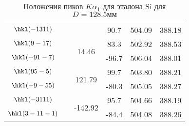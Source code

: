 \begin{table}[ht!]
\begin{tabular}{ |c|c|c|c|c|c| }
        $  \hkl(-1 3 11)$ &                         &                          &                90.7 &              504.09 &              388.18 \\
        $   \hkl(9 -1 7)$ &                         &   \multirow{2}{*}{14.46} &                83.3 &              502.92 &              388.53 \\
        $  \hkl(-9 1 -7)$ &                         &                          &               -96.7 &              506.04 &              388.01 \\
        $   \hkl(9 5 -5)$ &                         &  \multirow{2}{*}{121.79} &                99.7 &              503.80 &              388.21 \\
        $  \hkl(-9 -5 5)$ &                         &                          &               -80.3 &              505.05 &              388.27 \\
        $  \hkl(-3 11 1)$ &                         & \multirow{2}{*}{-142.92} &                95.7 &              504.66 &              388.19 \\
        $ \hkl(3 -11 -1)$ &                         &                          &               -84.4 &              504.08 &              388.26 \\
        \hline
    \end{tabular}
    \caption{Положения пиков $K\alpha_1$ для эталона Si для $D = 128.5\unit{мм}$}%
    \label{tab:Si}
\end{table}

